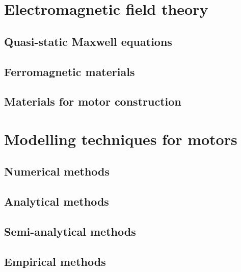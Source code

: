 \section{Electromagnetic field theory}              \label{Chapter:background/electromagnetic field theory}
    \subsection{Quasi-static Maxwell equations}     \label{Chapter:background/electromagnetic field theory/quasi-static maxwell equations}
    \subsection{Ferromagnetic materials}            \label{Chapter:background/electromagnetic field theory/ferromagnetic materials}
    \subsection{Materials for motor construction}   \label{Chapter:background/electromagnetic field theory/materials for motor construction}


\section{Modelling techniques for motors}           \label{Chapter:background/modelling techniques for designing motors}
    \subsection{Numerical methods}                  \label{Chapter:background/modelling techniques for designing motors/numerical methods}
    \subsection{Analytical methods}                 \label{Chapter:background/modelling techniques for designing motors/analytical methods}
    \subsection{Semi-analytical methods}            \label{Chapter:background/modelling techniques for designing motors/semi-analytical methods}
    \subsection{Empirical methods}                  \label{Chapter:background/modelling techniques for designing motors/empirical methods}


